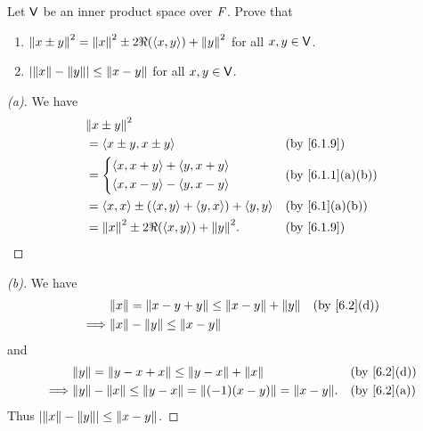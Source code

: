 \begin{ex}\label{ex:6.1.19}
  Let \(\mathsf{V}\) be an inner product space over \(\mathit{F}\).
  Prove that
  \begin{enumerate}
    \item \(\left\lVert x \pm y\right\rVert^2 = \left\lVert x\right\rVert^2 \pm 2 \Re(\left\langle x, y\right\rangle) + \left\lVert y\right\rVert^2\) for all \(x, y \in \mathsf{V}\).
    \item \(\left\lvert\left\lVert x\right\rVert - \left\lVert y\right\rVert\right\rvert \leq \left\lVert x - y\right\rVert\) for all \(x, y \in \mathsf{V}\).
  \end{enumerate}
\end{ex}

\begin{proof}[(a)]
  We have
  \begin{align*}
     & \norm{x \pm y}^2                                                                          \\
     & = \inn{x \pm y, x \pm y}                                &  & \text{(by \cref{6.1.9})}     \\
     & = \begin{dcases}
           \inn{x, x + y} + \inn{y, x + y} \\
           \inn{x, x - y} - \inn{y, x - y}
         \end{dcases}                      &  & \text{(by \cref{6.1.1}(a)(b))}                   \\
     & = \inn{x, x} \pm (\inn{x, y} + \inn{y, x}) + \inn{y, y} &  & \text{(by \cref{6.1}(a)(b))} \\
     & = \norm{x}^2 \pm 2 \Re(\inn{x, y}) + \norm{y}^2.        &  & \text{(by \cref{6.1.9})}
  \end{align*}
\end{proof}

\begin{proof}[(b)]
  We have
  \begin{align*}
             & \norm{x} = \norm{x - y + y} \leq \norm{x - y} + \norm{y} &  & \text{(by \cref{6.2}(d))} \\
    \implies & \norm{x} - \norm{y} \leq \norm{x - y}
  \end{align*}
  and
  \begin{align*}
             & \norm{y} = \norm{y - x + x} \leq \norm{y - x} + \norm{x}                   &  & \text{(by \cref{6.2}(d))} \\
    \implies & \norm{y} - \norm{x} \leq \norm{y - x} = \norm{(-1)(x - y)} = \norm{x - y}. &  & \text{(by \cref{6.2}(a))}
  \end{align*}
  Thus \(\left\lvert\left\lVert x\right\rVert - \left\lVert y\right\rVert\right\rvert \leq \left\lVert x - y\right\rVert\).
\end{proof}

